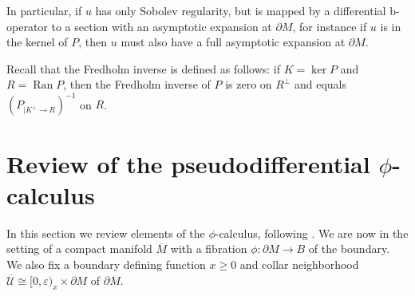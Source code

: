 \documentclass[11pt]{article}
\numberwithin{equation}{section}
\theoremstyle{plain}
\theoremstyle{definition}
\newcommand{\Umathbar}{{\overline{\mathscr{U}}}}
\DeclareMathOperator\Ran{Ran}
\newcommand{\dM}{{\partial M}}
\newcommand{\Mbar}{{\overline{M}}}\let\M\Mbar
\let\eps\varepsilon
\begin{document}
In particular, if $u$ has only Sobolev regularity, but is mapped by a differential b\nobreakdash-operator
to a section with an asymptotic expansion at $\partial M$, for instance if $u$ is in
the kernel of $P$, then $u$ must also have a full asymptotic expansion at $\partial M$.

Recall that the Fredholm inverse is defined as follows: if $K= \ker P$ and $R=\Ran P$, then the Fredholm inverse of $P$ is zero on $R^\perp$ and equals $(P_{|K^\perp\to R})^{-1}$ on $R$.

\section{Review of the pseudodifferential \texorpdfstring{$\phi$}{phi}-calculus}\label{sec:phi-calc}
In this section we review elements of the $\phi$-calculus,
following \cite{mazzeo1998pseudodifferential}.
We are now in the setting
of a compact manifold $\Mbar$ with a fibration $\phi:\partial M\to B$ of the boundary. We also fix a boundary defining function $x \geq 0$ and collar neighborhood $\Umathbar\cong [0,\eps)_x\times\dM$ of $\dM$.
\end{document}
